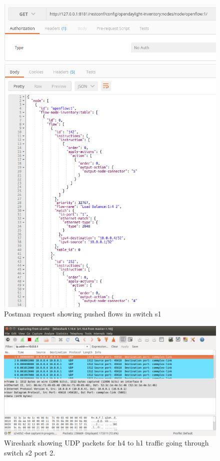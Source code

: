 \begin{figure}[h!]
 \centering
 \includegraphics[width=\linewidth]{images/loadbalancing/flows.png}
 \caption{Postman request showing pushed flows in switch s1}
 \label{fig:flows}
\end{figure}

\begin{figure}[h!]
 \centering
 \includegraphics[width=\linewidth]{images/loadbalancing/s2fromh1.png}
 \caption{Wireshark showing UDP packets for h4 to h1 traffic going through switch s2 port 2.}
 \label{fig:s2fromh1}
\end{figure}

